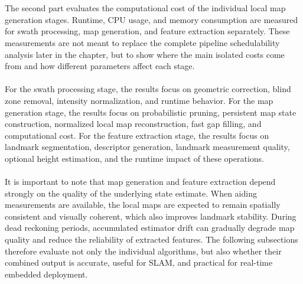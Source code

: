 \\ \\
The second part evaluates the computational cost of the individual local map generation stages. Runtime, CPU usage, and memory consumption are measured for swath processing, map generation, and feature extraction separately. These measurements are not meant to replace the complete pipeline schedulability analysis later in the chapter, but to show where the main isolated costs come from and how different parameters affect each stage.
\\ \\
For the swath processing stage, the results focus on geometric correction, blind zone removal, intensity normalization, and runtime behavior. For the map generation stage, the results focus on probabilistic pruning, persistent map state construction, normalized local map reconstruction, fast gap filling, and computational cost. For the feature extraction stage, the results focus on landmark segmentation, descriptor generation, landmark measurement quality, optional height estimation, and the runtime impact of these operations.
\\ \\
It is important to note that map generation and feature extraction depend strongly on the quality of the underlying state estimate. When aiding measurements are available, the local maps are expected to remain spatially consistent and visually coherent, which also improves landmark stability. During dead reckoning periods, accumulated estimator drift can gradually degrade map quality and reduce the reliability of extracted features. The following subsections therefore evaluate not only the individual algorithms, but also whether their combined output is accurate, useful for SLAM, and practical for real-time embedded deployment.



\newpage



